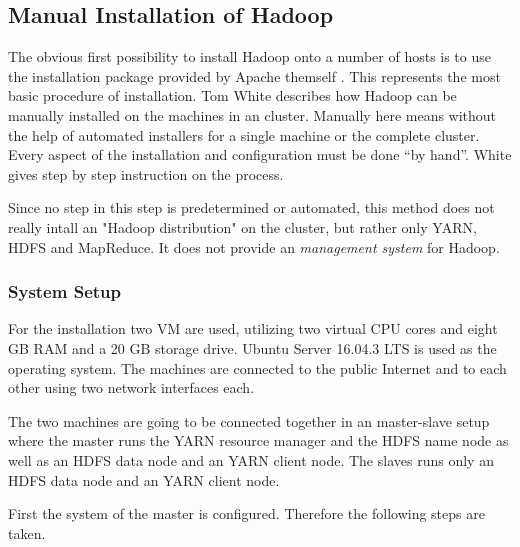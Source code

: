\subsection{Manual Installation of Hadoop}

The obvious first possibility to install Hadoop onto a number of hosts 
is to use the installation package provided by Apache themself .
This represents the most basic procedure of installation.
Tom White \autocite[][Appendix A]{white2015hadoop} describes how Hadoop can be manually installed on the machines in an cluster. 
Manually here means without the help of automated installers for a single machine or the complete cluster. 
Every aspect of the installation and configuration must be done \enquote{by hand}.
White gives step by step instruction on the process.

Since no step in this step is predetermined or automated, this method does not really intall an "Hadoop distribution" on the cluster, but rather only \ac{YARN}, \ac{HDFS} and MapReduce.
It does not provide an \emph{management system} for Hadoop.

\subsubsection{System Setup}
For the installation two \acs{VM} are used, utilizing two virtual \ac{CPU} cores and eight \ac{GB} \ac{RAM} and a 20 \ac{GB} storage drive. 
Ubuntu Server  16.04.3 \ac{LTS} is used as the operating system. 
The machines are connected to the public Internet and to each other using two network interfaces each.

The two machines are going to be connected together in an master-slave setup
where the master runs the \ac{YARN} resource manager and the \ac{HDFS} name node as well as an \ac{HDFS} data node and an \ac{YARN} client node.
The slaves runs only an \ac{HDFS} data node and an \ac{YARN} client node.

First the system of the master is configured. Therefore the following steps are taken.

